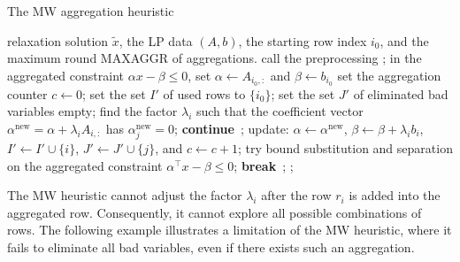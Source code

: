 \documentclass[a4paper,UKenglish,cleveref, autoref,  thm-restate]{lipics-v2021}
\newcommand{\relx}[1]{\tilde{#1}}
\begin{document}
	
	\begin{algorithm}
		\caption{The MW aggregation heuristic}
		\begin{algorithmic}[1]
			\Require relaxation solution $\relx{x}$, the LP data $(A,b)$, the starting row index $i_0$, and the maximum round MAXAGGR of aggregations.
			\State call the preprocessing ;
			\State in the aggregated constraint $\alpha x - \beta \leq 0$, set $\alpha \leftarrow A_{i_0,:}$ and $\beta \leftarrow b_{i_0}$ %
			\State set the aggregation counter $c \leftarrow  0$;
			\State set the set $I'$ of used rows  to $\{i_0\}$;
			\State set the set $J'$ of eliminated bad variables  empty;
			 \label{restart}
			\State find the factor $\lambda_{i}$ such that  the coefficient vector $\alpha^{\text{new}} = \alpha + \lambda_{i}  A_{i,:}$ %
			has $\alpha^{\text{new}}_j  = 0$; \label{algo.try}
			 \label{badaggr} \label{algo.accept}
			\State \textbf{continue}~; 
			\EndIf
			\State update: $\alpha  \leftarrow  \alpha^{\text{new}}$, $\beta \leftarrow \beta + \lambda_ib_i$, $I' \leftarrow I' \cup \{i\}$, $J' \leftarrow J' \cup \{j\}$, and $c \leftarrow c + 1$;
			\State try bound substitution and separation on the aggregated constraint $\alpha^\top x  - \beta \le 0 $; %
			\State  \textbf{break}~; %
			\Else
			\State \Return;
			\EndIf
			\EndFor
			\EndFor
		\end{algorithmic}
		\label{algo.mw}
	\end{algorithm}
	
	
	
	
	
	
	
	
	The MW heuristic cannot adjust the factor $\lambda_i$ after the row $r_i$ is added into the aggregated row. Consequently, it cannot explore all possible combinations of rows. The following example illustrates a limitation of the MW heuristic, where it fails to eliminate all bad variables, even if there exists such an aggregation.
	
\end{document}
